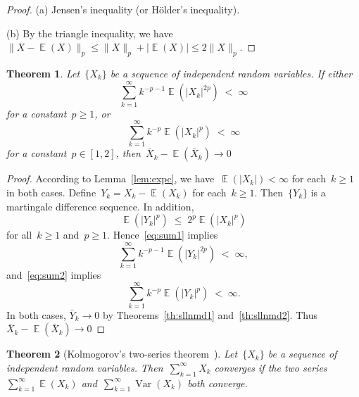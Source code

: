 \documentclass[12pt,a4paper]{article}  %
\newcounter{cite}
\newtheorem{theorem}{Theorem}[section]
\theoremstyle{definition}
\numberwithin{equation}{section}
\newcommand{\as}{{\text{a.s.}}\xspace}
\DeclareMathOperator{\var}{Var}
\DeclareMathOperator{\expc}{\mathbb{E}}
\begin{document}
\begin{proof}
    (a) Jensen's inequality (or H\"older's inequality).

    (b) By the triangle inequality, we have~$\|X - \expc(X)\|_p \le \|X\|_p + |\expc(X)| \le 2\|X\|_p$.
\end{proof}

\begin{theorem}
    \label{th:sllnindep}
    Let~$\{X_k\}$ be a sequence of independent random variables. If
    either
   \begin{equation}
    \label{eq:sum1}
    \sum_{k=1}^\infty k^{-p-1}\expc(|X_k|^{2p}) \;<\; \infty
   \end{equation}
   for a constant~$p\ge 1$, or
   \begin{equation}
    \label{eq:sum2}
    \sum_{k=1}^\infty k^{-p}\expc(|X_k|^{p}) \;<\; \infty
   \end{equation}
   for a constant~$p\in[1, 2]$, then~$\bar{X}_k - \expc(\bar{X}_k)\to 0$ \as
\end{theorem}

\begin{proof}
    According to Lemma~\ref{lem:expc}, we have~$\expc(|X_k|) < \infty$ for each~$k\ge 1$ in both cases.
    Define~$Y_k = X_k - \expc(X_k)$ for each~$k\ge 1$. Then~$\{Y_k\}$ is a martingale difference
    sequence. In addition,
    \[
        \expc(|Y_k|^{p}) \;\le\; 2^{p} \expc(|X_k|^p)
    \]
    for all~$k\ge 1$ and~$p\ge 1$. Hence~\eqref{eq:sum1} implies
   \begin{equation}
    \label{eq:sum11}
    \sum_{k=1}^\infty k^{-p-1}\expc(|Y_k|^{2p}) \;<\; \infty,
   \end{equation}
    and~\eqref{eq:sum2} implies
   \begin{equation}
    \label{eq:sum22}
    \sum_{k=1}^\infty k^{-p}\expc(|Y_k|^{p}) \;<\; \infty.
   \end{equation}
   In both cases, $\bar{Y}_k \to 0$ \as by Theorems~\ref{th:sllnmd1} and~\ref{th:sllnmd2}.
   Thus~$\bar{X}_k - \expc(\bar{X}_k) \to 0$ \as
\end{proof}

\begin{theorem}[Kolmogorov's two-series theorem~\mbox{\cite[Theorems~2.5.6]{Durrett_2019}}]
    \label{th:kolmogorov2}
    Let~$\{X_k\}$ be a sequence of independent random variables.
    Then~$\sum_{k=1}^\infty X_k$ converges \as if the two series~$\sum_{k=1}^\infty \expc(X_k)$
    and~$\sum_{k=1}^\infty \var(X_k)$ both converge.
\end{theorem}
\end{document}
